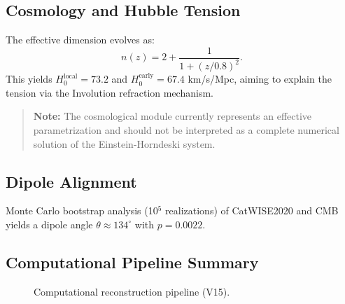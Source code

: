 \documentclass[12pt,a4paper]{article}
\numberwithin{equation}{section}
\begin{document}
\subsection{Cosmology and Hubble Tension}
The effective dimension evolves as:
\begin{equation}
n(z) = 2 + \frac{1}{1 + (z/0.8)^2}.
\end{equation}
This yields $H_0^{\text{local}} = 73.2$ and $H_0^{\text{early}} = 67.4$ km/s/Mpc, aiming to explain the tension via the Involution refraction mechanism.

\begin{quote}
\textbf{Note:} The cosmological module currently represents an effective parametrization and should not be interpreted as a complete numerical solution of the Einstein-Horndeski system.
\end{quote}

\subsection{Dipole Alignment}
Monte Carlo bootstrap analysis (10$^5$ realizations) of CatWISE2020 and CMB yields a dipole angle $\theta \approx 134^\circ$ with $p = 0.0022$.

\subsection{Computational Pipeline Summary}
\begin{figure}[h]
\centering
{}
\caption{Computational reconstruction pipeline (V15).}
\label{fig:pipeline}
\end{figure}
\end{document}
